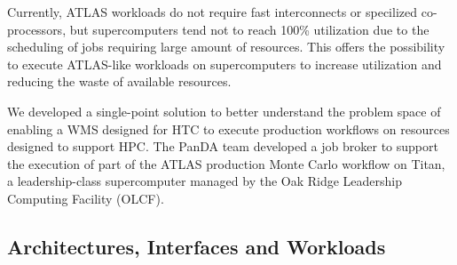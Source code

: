 Currently, ATLAS workloads do not require fast interconnects or specilized
co-processors, but supercomputers tend not to reach 100\% utilization due to
the scheduling of jobs requiring large amount of resources. This offers the
possibility to execute ATLAS-like workloads on supercomputers to increase
utilization and reducing the waste of available resources.

We developed a single-point solution to better understand the problem space
of enabling a WMS designed for HTC to execute production workflows on
resources designed to support HPC\@. The PanDA team developed a job broker to
support the execution of part of the ATLAS production Monte Carlo workflow on
Titan, a leadership-class supercomputer managed by the Oak Ridge Leadership
Computing Facility (OLCF).

\subsection{Architectures, Interfaces and Workloads}
\label{ssec:panda-titan}



